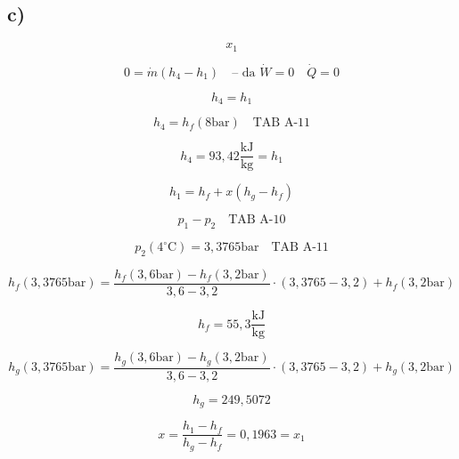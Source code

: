 

\subsection*{c)}
\[ x_1 \]

\[
0 = \dot{m} (h_4 - h_1) \quad \text{-- da } \dot{W} = 0 \quad \dot{Q} = 0
\]

\[
h_4 = h_1
\]

\[
h_4 = h_f (8 \text{bar}) \quad \text{TAB A-11}
\]

\[
h_4 = 93,42 \frac{\text{kJ}}{\text{kg}} = h_1
\]

\[
h_1 = h_f + x (h_g - h_f)
\]

\[
p_1 - p_2 \quad \text{TAB A-10}
\]

\[
p_2 (4^\circ \text{C}) = 3,3765 \text{bar} \quad \text{TAB A-11}
\]

\[
h_f (3,3765 \text{bar}) = \frac{h_f (3,6 \text{bar}) - h_f (3,2 \text{bar})}{3,6 - 3,2} \cdot (3,3765 - 3,2) + h_f (3,2 \text{bar})
\]

\[
h_f = 55,3 \frac{\text{kJ}}{\text{kg}}
\]

\[
h_g (3,3765 \text{bar}) = \frac{h_g (3,6 \text{bar}) - h_g (3,2 \text{bar})}{3,6 - 3,2} \cdot (3,3765 - 3,2) + h_g (3,2 \text{bar})
\]

\[
h_g = 249,5072
\]

\[
x = \frac{h_1 - h_f}{h_g - h_f} = 0,1963 = x_1
\]